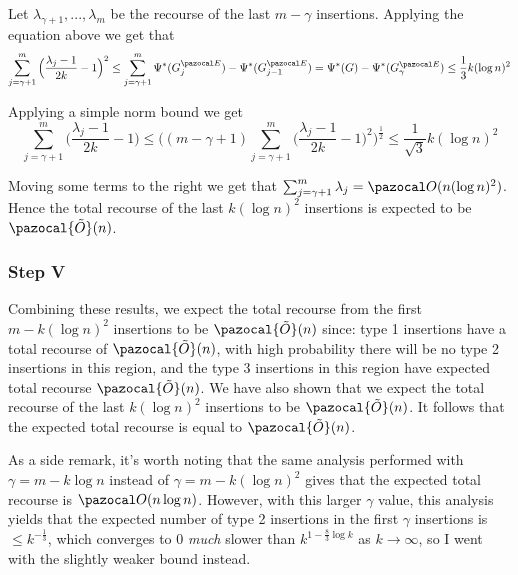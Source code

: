 \documentclass{report}
\begin{document}
Let $\lambda_{\gamma+1},...,\lambda_{m}$ be the recourse of the last $m - \gamma$ insertions. Applying the equation above we get that
\[\sum_{j=\gamma+1}^{m}\Big (\frac{\lambda_j - 1}{2k} - 1 \Big )^2 \leq \sum_{j=\gamma+1}^m \Psi^*(G^{\pazocal E}_j) - \Psi^*(G^{\pazocal E}_{j-1}) = \Psi^*(G) - \Psi^*(G^{\pazocal E}_{\gamma}) \leq \frac{1}{3}k(\log n)^2 \]

Applying a simple norm bound we get
\[\sum_{j=\gamma+1}^{m}\Big (\frac{\lambda_j - 1}{2k} - 1 \Big ) \leq \bigg((m-\gamma+1) \sum_{j=\gamma+1}^{m}\Big (\frac{\lambda_j - 1}{2k} - 1 \Big )^2 \bigg ) ^{\frac{1}{2}} \leq \frac{1}{\sqrt 3} k (\log n)^2\]

Moving some terms to the right we get that $\sum_{j=\gamma+1}^{m}\lambda_{j} = \pazocal O (n (\log n)^2)$. Hence the total recourse of the last $k(\log n)^2$ insertions is expected to be $\pazocal{\tilde{O}}(n)$.

\subsubsection{Step V}

Combining these results, we expect the total recourse from the first $m-k(\log n)^2$ insertions to be $\pazocal{\tilde{O}}(n)$ since: type 1 insertions have a total recourse of $\pazocal{\tilde{O}}(n)$, with high probability there will be no type 2 insertions in this region, and the type 3 insertions in this region have expected total recourse $\pazocal{\tilde{O}}(n)$. We have also shown that we expect the total recourse of the last $k (\log n)^2$ insertions to be $\pazocal{\tilde{O}}(n)$. It follows that the expected total recourse is equal to $\pazocal{\tilde{O}}(n)$.

As a side remark, it's worth noting that the same analysis performed with $\gamma = m - k \log n$ instead of $\gamma = m - k (\log n)^2$ gives that the expected total recourse is $\pazocal O (n \log n)$. However, with this larger $\gamma$ value, this analysis yields that the expected number of type 2 insertions in the first $\gamma$ insertions is $\leq k^{-\frac{1}{3}}$, which converges to 0 \textit{much} slower than $k^{1-\frac{8}{3}\log k}$ as $k \rightarrow \infty$, so I went with the slightly weaker bound instead.
\end{document}
